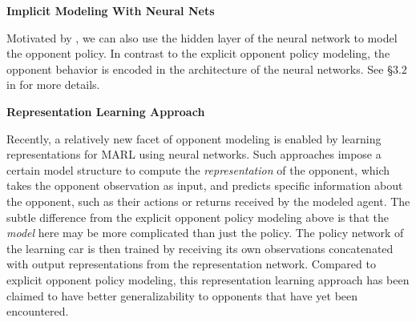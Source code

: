  

\vspace{7pt}
\noindent\textbf{Implicit Modeling With Neural Nets} 
\vspace{3pt}

Motivated by \cite{he2016opponent}, we can also use the hidden layer of the neural network to model the opponent policy. In contrast to the explicit opponent policy modeling, the opponent behavior is encoded in the architecture of the neural networks. See \S$3.2$ in \cite{he2016opponent} for more details. 




\vspace{7pt}
\noindent\textbf{Representation Learning Approach}
\vspace{3pt}

Recently, a relatively new facet of opponent modeling is enabled by learning representations for MARL using neural networks. Such approaches impose a certain model structure to compute the \emph{representation} of the opponent, which takes the opponent observation as input, and predicts specific information about the opponent, such as their actions \citep{grover2018learning} or returns \citep{tacchetti2018relational} received by the modeled agent. The subtle difference from the explicit opponent policy modeling above is that the \emph{model} here may be more complicated than just the policy. The policy network of the learning car is then trained by receiving its own observations concatenated with output representations from the representation network. Compared to explicit opponent policy modeling, this representation learning approach has been claimed to have better generalizability to opponents that have yet been encountered. 





